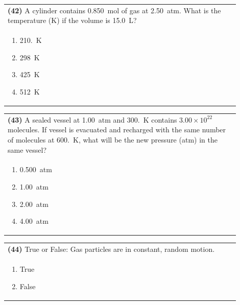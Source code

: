 \documentclass{article}
\begin{document}
{{\vspace{0.2cm}
\noindent\begin{tabular}{|p{0.9\linewidth}|}
\hline
\textbf{(42)} A cylinder contains 0.850~mol of gas at 2.50~atm. What is the temperature (K) if the volume is 15.0~L?\\[0.2cm]

\begin{minipage}[t]{0.85\linewidth}
\begin{enumerate}[label=\alph*.]
\item 210.~K
\item 298~K
\item 425~K
\item 512~K
\end{enumerate}
\end{minipage}\\[0.2cm]
\hline
\end{tabular}

\vspace{0.2cm}
\noindent\begin{tabular}{|p{0.9\linewidth}|}
\hline
\textbf{(43)} A sealed vessel at 1.00~atm and 300.~K contains $3.00\times10^{22}$ molecules. If vessel is evacuated and recharged with the same number of molecules at 600.~K, what will be the new pressure (atm) in the same vessel?\\[0.2cm]

\begin{minipage}[t]{0.85\linewidth}
\begin{enumerate}[label=\alph*.]
\item 0.500~atm
\item 1.00~atm
\item 2.00~atm
\item 4.00~atm
\end{enumerate}
\end{minipage}\\[0.2cm]
\hline
\end{tabular}

\vspace{0.2cm}
\noindent\begin{tabular}{|p{0.9\linewidth}|}
\hline
\textbf{(44)} True or False: Gas particles are in constant, random motion.\\[0.2cm]

\begin{minipage}[t]{0.85\linewidth}
\begin{enumerate}[label=\alph*.]
\item True
\item False
\end{enumerate}
\end{minipage}\\[0.2cm]
\hline
\end{tabular}

}}
\end{document}
